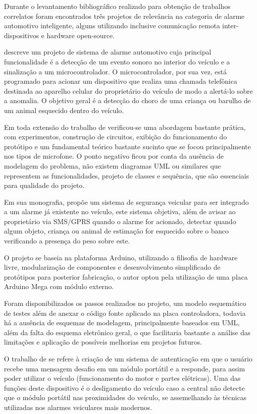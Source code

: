 Durante o levantamento bibliográfico realizado para obtenção de trabalhos correlatos foram encontrados três projetos de relevância na categoria de alarme automotivo inteligente, alguns utilizando inclusive comunicação remota inter-dispositivos e hardware open-source.

\textcite{ivan:2007} descreve um projeto de sistema de alarme automotivo 
cuja principal funcionalidade é a detecção de um evento sonoro no interior do veículo e a sinalização a um microcontrolador. O microcontrolador, por sua vez, está programado para acionar um dispositivo que realiza uma chamada telefônica destinada ao aparelho celular do proprietário do veículo de modo a alertá-lo sobre a anomalia. O objetivo geral é a detecção do choro de uma criança ou barulho de um animal esquecido dentro do veículo. 

Em toda extensão do trabalho de \textcite{ivan:2007} verificou-se uma abordagem bastante prática, com 
experimentos, construção de circuitos, exibição do funcionamento do 
protótipo e um fundamental teórico bastante sucinto 
que se focou principalmente nos tipos de microfone. O ponto negativo ficou 
por conta da ausência de modelagem do problema, não existem diagramas UML ou 
similares que representem as funcionalidades, projeto de classes e sequência, 
que são essenciais para qualidade do projeto.

Em sua monografia, \textcite{leandro:2010} propõe um sistema de segurança veicular para ser integrado a um alarme já existente no veículo, este sistema objetiva, além de avisar ao proprietário via SMS/GPRS quando o alarme for acionado, detectar quando algum objeto, criança ou animal de estimação for esquecido sobre o banco verificando a presença do peso sobre este. 

O projeto se baseia na plataforma Arduino, utilizando a filisofia de hardware 
livre, modularização de componentes e desenvolvimento simplificado de protótipos 
para posterior fabricação, o autor optou pela utilização de uma placa Arduino 
Mega com módulo externo. 

Foram disponibilizados os passos realizados no projeto, um modelo esquemático de testes além de anexar o código fonte aplicado na placa controladora, todavia há a ausência de esquemas de modelagem, principalmente baseados em UML, além da falta do esquema eletrônico geral, o que facilitaria bastante a análise das limitações e aplicação de possíveis melhorias em projetos futuros.

O trabalho de \textcite{alfonso:2006} se refere à criação de um sistema de autenticação em que o usuário recebe uma mensagem desafio em um módulo portátil e a responde, para assim poder utilizar o veículo (funcionamento do motor e partes elétricas). Uma das funções deste dispositivo é o desligamento do veículo caso a central não detecte que o módulo portátil nas proximidades do veículo, se assemelhando às técnicas utilizadas nos alarmes veiculares mais modernos.

